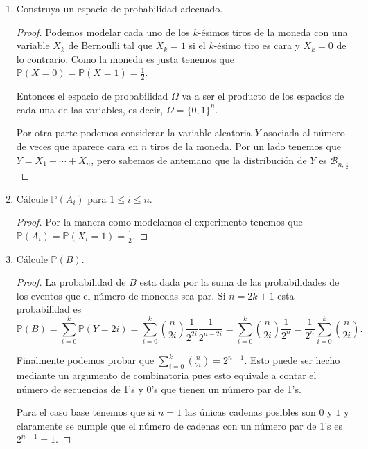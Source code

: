 \documentclass[paper=letter, fontsize=11pt]{scrartcl} %
\numberwithin{equation}{section} %
\numberwithin{figure}{section} %
\numberwithin{table}{section} %
\newcommand{\prob}[1]{\mathbb{P}(#1)}
\begin{document}
\begin{enumerate}[label = \arabic*)]
\item Construya un espacio de probabilidad adecuado.

\begin{proof}
Podemos modelar cada uno de los $ k $-ésimos tiros de la moneda con una variable $ X_k $ de Bernoulli tal que $ X_k=1 $ si el $ k$-ésimo tiro es cara y $ X_k=0 $ de lo contrario. Como la moneda es justa tenemos que $ \prob{X=0}=\prob{X=1}=\frac{1}{2} $.

Entonces el espacio de probabilidad $ \Omega $ va a ser el producto de los espacios de cada una de las variables, es decir, $ \Omega = \{0,1 \}^n $.

Por otra parte podemos considerar la variable aleatoria $ Y $ asociada al número de veces que aparece cara en $ n $ tiros de la moneda. Por un lado tenemos que $ Y = X_1 + \cdots + X_n $, pero sabemos de antemano que la distribución de $ Y $ es $ \mathcal{B}_{n,\frac{1}{2}} $ 
\end{proof}

\item Cálcule $ \mathbb{P}(A_i) $ para $ 1 \leq i \leq n $.

\begin{proof}
Por la manera como modelamos el experimento tenemos que $ \prob{A_i}=\prob{X_i=1}=\frac{1}{2} $.
\end{proof}

\item Cálcule $ \mathbb{P}(B) $.
\begin{proof}
La probabilidad de $ B $ esta dada por la suma de las probabilidades de los eventos que el número de monedas sea par. Si $ n = 2k+1 $ esta probabilidad es
\begin{equation}
\prob{B}=\sum_{i=0}^k \prob{Y=2i}=\sum_{i=0}^k \binom{n}{2i}\frac{1}{2^{2i}}\frac{1}{2^{n-2i}}=\sum_{i=0}^k \binom{n}{2i}\frac{1}{2^n} = \frac{1}{2^n} \sum_{i=0}^k \binom{n}{2i} \nonumber. 
\end{equation}

Finalmente podemos probar que $ \sum_{i=0}^k \binom{n}{2i} = 2^{n-1} $. Esto puede ser hecho mediante un argumento de combinatoria pues esto equivale a contar el número de secuencias de 1's y 0's que tienen un número par de 1's.

Para el caso base tenemos que si $ n=1 $ las únicas cadenas posibles son $ 0 $ y $ 1 $ y claramente se cumple que el número de cadenas con un número par de 1's es $ 2^{n-1}=1 $. 


\end{proof}
\end{enumerate}
\end{document}
